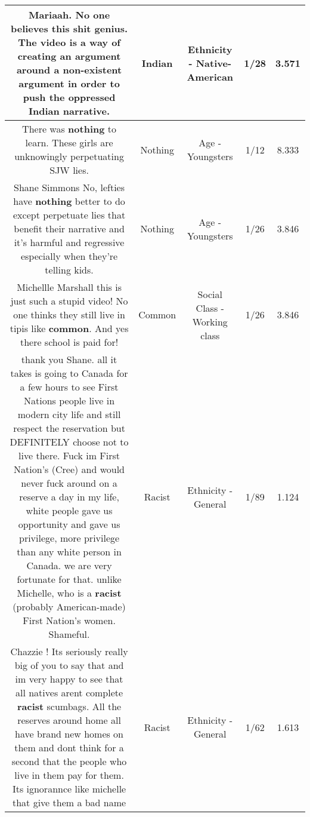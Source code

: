 \documentclass[11pt]{article}
\newlength\mylength
\begin{document}
\begin{center}
\begin{longtable}{|C{.65\mylength}|C{.30\mylength}|C{.12\mylength}|C{.12\mylength}|C{.12\mylength}|}
  \small Mariaah. No one believes this shit genius. The video is a way of creating an argument around a non-existent argument in order to push the oppressed \textbf{Indian} narrative.\normalsize   & Indian & Ethnicity - Native-American & 1/28 & 3.571 \\  \hline
  \small There was \textbf{nothing} to learn. These girls are unknowingly perpetuating SJW lies.\normalsize   & Nothing & Age - Youngsters & 1/12 & 8.333 \\  \hline
  \small Shane Simmons No, lefties have \textbf{nothing} better to do except perpetuate lies that benefit their narrative and it's harmful and regressive especially when they're telling kids.\normalsize   & Nothing & Age - Youngsters & 1/26 & 3.846 \\  \hline
  \small Michellle Marshall this is just such a stupid video! No one thinks they still live in tipis like \textbf{common}. And yes there school is paid for!\normalsize   & Common & Social Class - Working class & 1/26 & 3.846 \\  \hline
  \small thank you Shane. all it takes is going to Canada for a few hours to see First Nations people live in modern city life and still respect the reservation but DEFINITELY choose not to live there. Fuck im First Nation's (Cree) and would never fuck around on a reserve a day in my life, white people gave us opportunity and gave us privilege, more privilege than any white person in Canada. we are very fortunate for that. unlike Michelle, who is a \textbf{racist} (probably American-made) First Nation's women. Shameful.\normalsize   & Racist & Ethnicity - General & 1/89 & 1.124 \\  \hline
  \small Chazzie ! Its seriously really big of you to say that and im very happy to see that all natives arent complete \textbf{racist} scumbags. All the reserves around home all have brand new homes on them and dont think for a second that the people who live in them pay for them. Its ignorannce like michelle that give them a bad name\normalsize   & Racist & Ethnicity - General & 1/62 & 1.613 \\  \hline

\end{longtable}
\end{center}
\end{document}
